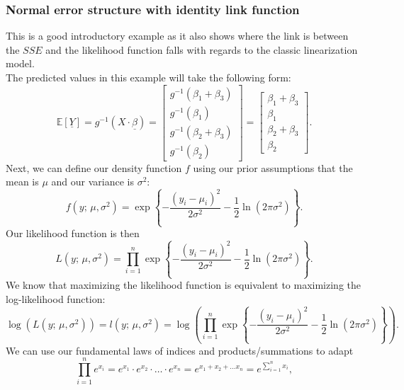 \documentclass{article}
\begin{document}
\subsubsection{Normal error structure with identity link function}
This is a good introductory example as it also shows where the link is between the $SSE$ and the likelihood function falls with regards to the classic linearization model. \\
The predicted values in this example will take the following form:
\begin{equation}
    \mathbb{E}[\underline{Y}] = g^{-1}(X\cdot \underline{\beta}) = \begin{bmatrix} g^{-1}(\beta_1 + \beta_3) \\ g^{-1}(\beta_1) \\ g^{-1}(\beta_2 + \beta_3) \\ g^{-1}(\beta_2) \end{bmatrix} = \begin{bmatrix} \beta_1 + \beta_3 \\ \beta_1 \\ \beta_2 + \beta_3 \\ \beta_2 \end{bmatrix}.
\end{equation}
Next, we can define our density function $f$ using our prior assumptions that the mean is $\mu$ and our variance is $\sigma^2$:
\begin{equation}
    f(y;\,\mu,\sigma^2) = \exp{\left\{ -\frac{(y_i-\mu_i)^2}{2\sigma^2}-\frac{1}{2}\ln{(2\pi\sigma^2)} \right\}}.
\end{equation}
Our likelihood function is then
\begin{equation}
    L(y;\,\mu,\sigma^2) = \prod_{i=1}^n\exp{\left\{ -\frac{(y_i-\mu_i)^2}{2\sigma^2}-\frac{1}{2}\ln{(2\pi\sigma^2)} \right\}}.
\end{equation}
We know that maximizing the likelihood function is equivalent to maximizing the log-likelihood function:
\begin{equation}
    \log(L(y;\,\mu,\sigma^2)) = l(y;\,\mu,\sigma^2) = \log\left(\prod_{i=1}^n\exp{\left\{ -\frac{(y_i-\mu_i)^2}{2\sigma^2}-\frac{1}{2}\ln{(2\pi\sigma^2)} \right\}}\right).\label{eq:log_like}
\end{equation}
We can use our fundamental laws of indices and products/summations to adapt 
\begin{equation}
    \prod_{i=1}^n e^{x_i} = e^{x_1}\cdot e^{x_2}\cdot\ldots\cdot e^{x_n} = e^{x_1+x_2+\ldots x_n} = e^{\sum_{i=1}^n x_i},
\end{equation}
\end{document}
